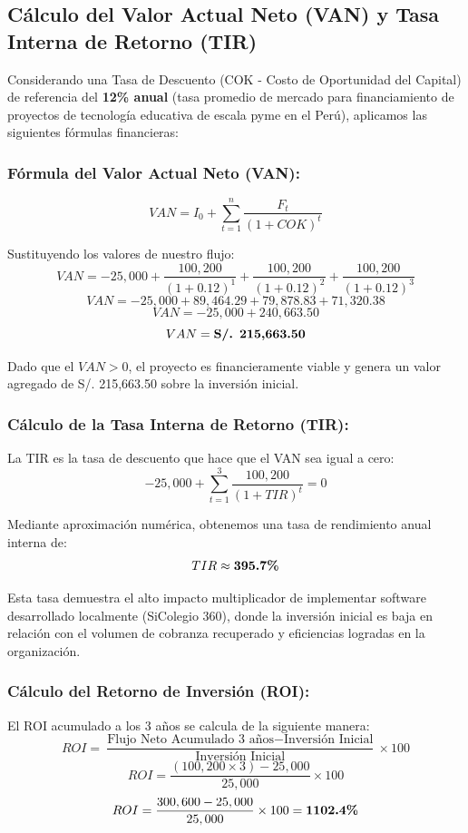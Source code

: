 \documentclass[12pt,a4paper,oneside]{report}
\begin{document}
\subsection{Cálculo del Valor Actual Neto (VAN) y Tasa Interna de Retorno (TIR)}

Considerando una Tasa de Descuento (COK - Costo de Oportunidad del Capital) de referencia del \textbf{12\% anual} (tasa promedio de mercado para financiamiento de proyectos de tecnología educativa de escala pyme en el Perú), aplicamos las siguientes fórmulas financieras:

\subsubsection{Fórmula del Valor Actual Neto (VAN):}
\[ VAN = I_0 + \sum_{t=1}^{n} \frac{F_t}{(1 + COK)^t} \]

Sustituyendo los valores de nuestro flujo:
\[ VAN = -25,000 + \frac{100,200}{(1 + 0.12)^1} + \frac{100,200}{(1 + 0.12)^2} + \frac{100,200}{(1 + 0.12)^3} \]
\[ VAN = -25,000 + 89,464.29 + 79,878.83 + 71,320.38 \]
\[ VAN = -25,000 + 240,663.50 \]
\[ VAN = \text{\textbf{S/. 215,663.50}} \]

Dado que el $VAN > 0$, el proyecto es financieramente viable y genera un valor agregado de S/. 215,663.50 sobre la inversión inicial.

\subsubsection{Cálculo de la Tasa Interna de Retorno (TIR):}
La TIR es la tasa de descuento que hace que el VAN sea igual a cero:
\[ -25,000 + \sum_{t=1}^{3} \frac{100,200}{(1 + TIR)^t} = 0 \]

Mediante aproximación numérica, obtenemos una tasa de rendimiento anual interna de:
\[ TIR \approx \text{\textbf{395.7\%}} \]

Esta tasa demuestra el alto impacto multiplicador de implementar software desarrollado localmente (SiColegio 360), donde la inversión inicial es baja en relación con el volumen de cobranza recuperado y eficiencias logradas en la organización.

\subsubsection{Cálculo del Retorno de Inversión (ROI):}
El ROI acumulado a los 3 años se calcula de la siguiente manera:
\[ ROI = \frac{\text{Flujo Neto Acumulado 3 años} - \text{Inversión Inicial}}{\text{Inversión Inicial}} \times 100 \]
\[ ROI = \frac{(100,200 \times 3) - 25,000}{25,000} \times 100 \]
\[ ROI = \frac{300,600 - 25,000}{25,000} \times 100 = \text{\textbf{1102.4\%}} \]
\end{document}
